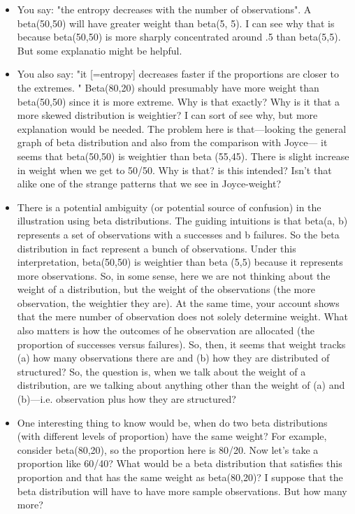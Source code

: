 \documentclass[
  10pt,
  dvipsnames,enabledeprecatedfontcommands]{scrartcl}
\begin{document}
\begin{itemize}
\item You say: "the entropy decreases with the number of observations". A beta(50,50) will have greater weight than beta(5, 5). I can see why that is because beta(50,50) is more sharply concentrated around .5 than beta(5,5). But some explanatio might be helpful.

\item You also say: "it [=entropy] decreases faster if the proportions are closer to the extremes. "
Beta(80,20) should presumably have more weight than beta(50,50) since it is more extreme. Why is that exactly? Why is it that a more skewed distribution is weightier? I can sort of see why, but more explanation would be needed.
The problem here is that---looking the general graph of beta distribution and also from the comparison with Joyce---
it seems that beta(50,50) is weightier than beta (55,45). There is slight increase in weight when we get to 50/50. Why is that? is this intended? Isn't that alike one of the strange patterns that we see in Joyce-weight?


\item There is a potential ambiguity (or potential source of confusion) in the illustration using beta distributions.
The guiding intuitions is that beta(a, b) represents a set of observations with a successes and b failures.
So the beta distribution in fact represent a bunch of observations. Under this interpretation, beta(50,50) is weightier than
beta (5,5) because it represents more observations. So, in some sense, here we are not thinking about the weight of a distribution, but the weight of the observations (the more observation, the weightier they are). At the same time, your account shows that the mere number of observation does not solely determine weight. What also matters is how the outcomes of he observation are allocated (the proportion of successes versus failures). So, then, it seems that weight tracks (a) how many observations there are and (b) how they are distributed of structured?  So, the question is, when we talk about the weight of a distribution, are we talking about anything other than the weight of (a) and (b)---i.e. observation plus how they are structured?

\item One interesting thing to know would be, when do two beta distributions (with different levels of proportion) have the same weight? For example, consider beta(80,20), so the proportion here is 80/20. Now let's take a proportion like 60/40? What would be a beta distribution that satisfies this proportion and that has the same weight as beta(80,20)? I suppose that the beta distribution will have to have more sample observations. But how many more?



\end{itemize}
\end{document}
